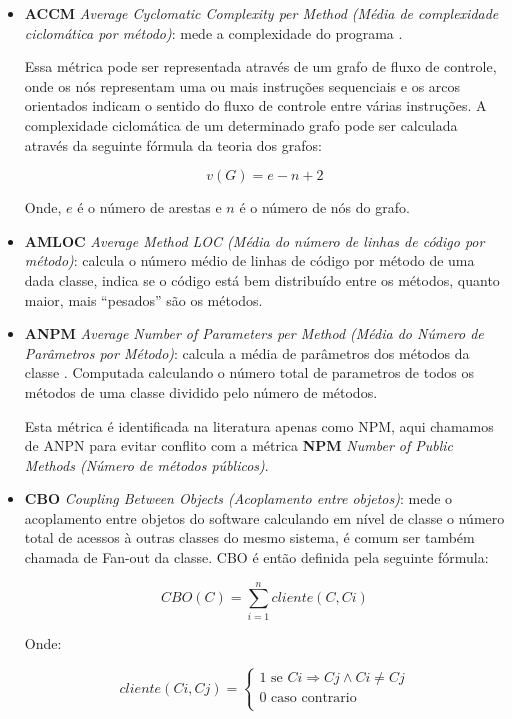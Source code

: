 \begin{itemize}
  \item {\bf ACCM} {\it Average Cyclomatic Complexity per Method (Média de
    complexidade ciclomática por método)}: mede a complexidade do programa
    \cite{McCabe1976}.

Essa métrica pode ser representada através de um grafo de fluxo de controle,
onde os nós representam uma ou mais instruções sequenciais e os arcos
orientados indicam o sentido do fluxo de controle entre várias instruções. A
complexidade ciclomática de um determinado grafo pode ser calculada através da
seguinte fórmula da teoria dos grafos:

\[ v(G) = e - n + 2 \]

Onde, $e$ é o número de arestas e $n$ é o número de nós do grafo.


  \item {\bf AMLOC} {\it Average Method LOC (Média do número de linhas de
    código por método)}: calcula o número médio de linhas de código por método
    de uma dada classe, indica se o código está bem distribuído entre os
    métodos, quanto maior, mais ``pesados'' são os métodos.

  \item {\bf ANPM} {\it Average Number of Parameters per Method (Média do
    Número de Parâmetros por Método)}: calcula a média de parâmetros dos
    métodos da classe \cite{Jagdish1997}. Computada calculando o número
    total de parametros de todos os métodos de uma classe dividido pelo número
    de métodos.

    Esta métrica é identificada na literatura apenas como NPM, aqui chamamos de
    ANPN para evitar conflito com a métrica {\bf NPM} {\it Number of Public
    Methods (Número de métodos públicos)}.

  \item {\bf CBO} {\it Coupling Between Objects (Acoplamento entre objetos)}:
    mede o acoplamento entre objetos do software \cite{Chidamber1994}
    calculando em nível de classe o número total de acessos à outras classes do
    mesmo sistema, é comum ser também chamada de Fan-out da classe. CBO é então
    definida pela seguinte fórmula:

\begin{equation}
\label{formula-cbo}
CBO(C) = \sum_{i=1}^{n} cliente(C, Ci)
\end{equation}

Onde:

\begin{equation}
cliente(Ci, Cj) =
  \begin{cases}
    1 \text{ se } Ci \Rightarrow Cj \wedge Ci \neq Cj \\
    0 \text{ caso contrario} \\
  \end{cases}
\end{equation}


\end{itemize}
